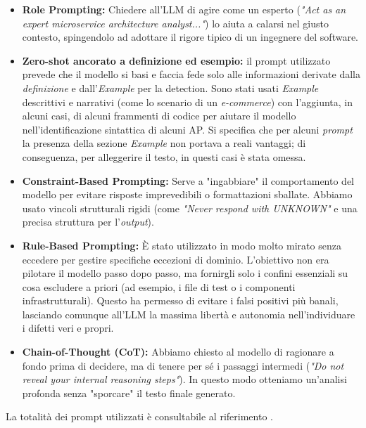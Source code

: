 \begin{itemize}
    \item \textbf{Role Prompting:} Chiedere all'LLM di agire come un esperto (\textit{"Act as an expert microservice architecture analyst..."}) lo aiuta a calarsi nel giusto contesto, spingendolo ad adottare il rigore tipico di un ingegnere del software.
    
    \item \textbf{Zero-shot ancorato a definizione ed esempio:} il prompt utilizzato prevede che il modello si basi e faccia fede solo alle informazioni derivate dalla \textit{definizione} e dall'\textit{Example} per la detection. Sono stati usati \textit{Example} descrittivi e narrativi (come lo scenario di un \textit{e-commerce}) con l'aggiunta, in alcuni casi, di alcuni frammenti di codice per aiutare il modello nell'identificazione sintattica di alcuni AP. 
    Si specifica che per alcuni \textit{prompt} la presenza della sezione \textit{Example} non portava a reali vantaggi; di conseguenza, per alleggerire il testo, in questi casi è stata omessa.
    
    \item \textbf{Constraint-Based Prompting:} Serve a "ingabbiare" il comportamento del modello per evitare risposte imprevedibili o formattazioni sballate. Abbiamo usato vincoli strutturali rigidi (come \textit{"Never respond with UNKNOWN"} e una precisa struttura per l'\textit{output}).
    
    \item \textbf{Rule-Based Prompting:} È stato utilizzato in modo molto mirato senza eccedere per gestire specifiche eccezioni di dominio. L'obiettivo non era pilotare il modello passo dopo passo, ma fornirgli solo i confini essenziali su cosa escludere a priori (ad esempio, i file di test o i componenti infrastrutturali). Questo ha permesso di evitare i falsi positivi più banali, lasciando comunque all'LLM la massima libertà e autonomia nell'individuare i difetti veri e propri.
    
    \item \textbf{Chain-of-Thought (CoT):} Abbiamo chiesto al modello di ragionare a fondo prima di decidere, ma di tenere per sé i passaggi intermedi (\textit{"Do not reveal your internal reasoning steps"}). In questo modo otteniamo un'analisi profonda senza "sporcare" il testo finale generato.
    
\end{itemize}

La totalità dei prompt utilizzati è consultabile al riferimento \cite{barbato_tesi_llm_scripts}.

